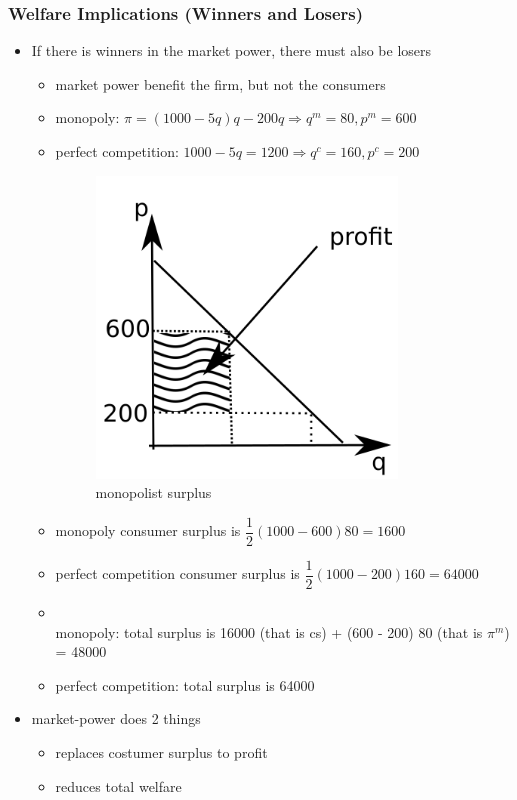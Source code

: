 \documentclass[12pt, a4paper, titlepage]{extarticle}
\begin{document}
	\subsubsection{Welfare Implications (Winners and Losers)}
	\begin{itemize}
    \item If there is winners in the market power, there must also be losers
        \begin{itemize}
        \item market power benefit the firm, but not the consumers 
        \item monopoly: $\pi = (1000 - 5q) q - 200 q \Rightarrow q^m = 80, p^m= 600$
        \item perfect competition: $1000 - 5q = 1200 \Rightarrow q^c=160, p^c = 200$
        \begin{figure}[htp]
	\centering
	    \includegraphics[width=8cm]{monopoly_profit.png}
	    \caption{monopolist surplus\label{fig:monopoly_profit}}
	\end{figure}
	    \item monopoly consumer surplus is $\dfrac12 (1000 - 600)80 = 1600$
	    \item perfect competition consumer surplus is $\dfrac12 (1000 - 200)160 = 64000$
	    \item {}\\ monopoly: total surplus is 16000 (that is cs) + (600 - 200) 80 (that is $\pi^m$) = 48000
	    \item perfect competition: total surplus is 64000
        \end{itemize}
    \item market-power does 2 things
    \begin{itemize}
    \item replaces costumer surplus to profit
    \item reduces total welfare
    \end{itemize}
    \end{itemize}
	
\end{document}
